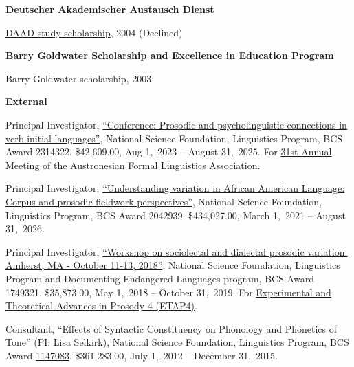 \documentclass[10pt]{article}
\renewcommand{\section}[1]{\pagebreak[3]%
    \vspace{1.3\baselineskip}%
    \phantomsection\addcontentsline{toc}{section}{#1}%
    \noindent\llap{\scshape\smash{\parbox[t]{\marginparwidth}{\hyphenpenalty=10000\raggedright #1}}}%
    \vspace{-\baselineskip}\par}
\newcommand{\halfblankline}{\quad\vspace{-0.5\baselineskip}\pagebreak[3]}
\begin{document}
\halfblankline

\href{https://www.daad.org/}{\textbf{Deutscher Akademischer Austausch Dienst}}
\begin{innerlist}
\item \href{https://www.daad.org/?p=73215}
           {DAAD study scholarship}, 2004 (Declined)
\end{innerlist}

\halfblankline

\href{http://www.act.org/goldwater/}{\textbf{Barry Goldwater Scholarship and Excellence in Education Program}}
\begin{innerlist}
\item {Barry Goldwater scholarship}, 2003
\end{innerlist}

\section{Grants}


\textbf{External} \hfill

\halfblankline


\begin{bibsection}

    \item Principal Investigator, \href{https://www.nsf.gov/awardsearch/showAward?AWD_ID=1749321&HistoricalAwards=false}{``Conference: Prosodic and psycholinguistic connections in verb-initial languages''}, National Science Foundation, Linguistics Program, BCS Award 2314322. \$42,609.00, Aug 1,~2023 -- August 31,~2025. For \href{https://websites.umass.edu/afla31/}{31st Annual Meeting of the Austronesian Formal Linguistics Association}.

    \item Principal Investigator, \href{https://www.nsf.gov/awardsearch/showAward?AWD_ID=2042939&HistoricalAwards=false}{``Understanding variation in African American Language: Corpus and prosodic fieldwork perspectives''}, National Science Foundation, Linguistics Program, BCS Award 2042939. \$434,027.00, March 1,~2021 -- August 31,~2026.


    \item Principal Investigator, \href{https://www.nsf.gov/awardsearch/showAward?AWD_ID=1749321&HistoricalAwards=false}{``Workshop on sociolectal and dialectal prosodic variation: Amherst, MA - October 11-13, 2018''}, National Science Foundation, Linguistics Program and Documenting Endangered Languages program, BCS Award 1749321. \$35,873.00, May 1,~2018 -- October 31,~2019. For \href{https://etap4.krisyu.org}{Experimental and Theoretical Advances in Prosody 4 (ETAP4)}.


    \item Consultant,
        ``Effects of Syntactic Constituency on Phonology and Phonetics
        of Tone'' \linebreak[4] (PI: Lisa Selkirk), National Science Foundation, Linguistics Program, BCS Award
        \href{http://www.nsf.gov/awardsearch/showAward?AWD_ID=1147083}{1147083}.
        \$361,283.00, July 1,~2012 -- December 31,~2015.

\end{bibsection}
\end{document}

